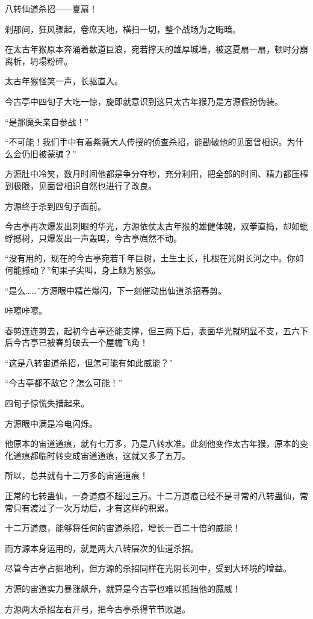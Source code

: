 \begin{this_body}
八转仙道杀招――夏扇！

刹那间，狂风骤起，卷席天地，横扫一切，整个战场为之晦暗。

在太古年猴原本奔涌着数道巨浪，宛若撑天的雄厚城墙，被这夏扇一扇，顿时分崩离析，坍塌粉碎。

太古年猴怪笑一声，长驱直入。

今古亭中四旬子大吃一惊，旋即就意识到这只太古年猴乃是方源假扮伪装。

“是那魔头亲自参战！”

“不可能！我们手中有着紫薇大人传授的侦查杀招，能勘破他的见面曾相识。为什么会仍旧被蒙骗？”

方源肚中冷笑，数月时间他都是争分夺秒，充分利用，把全部的时间、精力都压榨到极限，见面曾相识自然也进行了改良。

方源终于杀到四旬子面前。

今古亭再次爆发出刺眼的华光，方源依仗太古年猴的雄健体魄，双拳直捣，却如蚍蜉撼树，只爆发出一声轰鸣，今古亭岿然不动。

“没有用的，现在的今古亭宛若千年巨树，土生土长，扎根在光阴长河之中。你如何能撼动？”旬果子尖叫，身上颇为紧张。

“是么……”方源眼中精芒爆闪，下一刻催动出仙道杀招春剪。

咔嚓咔嚓。

春剪连连剪去，起初今古亭还能支撑，但三两下后，表面华光就明显不支，五六下后今古亭已被春剪破去一个屋檐飞角！

“这是八转宙道杀招，但怎可能有如此威能？”

“今古亭都不敌它？怎么可能！”

四旬子惊慌失措起来。

方源眼中满是冷电闪烁。

他原本的宙道道痕，就有七万多，乃是八转水准。此刻他变作太古年猴，原本的变化道痕都临时转变成宙道道痕，这就又多了五万。

所以，总共就有十二万多的宙道道痕！

正常的七转蛊仙，一身道痕不超过三万。十二万道痕已经不是寻常的八转蛊仙，常常只有渡过了一次万劫后，才有这样的积累。

十二万道痕，能够将任何的宙道杀招，增长一百二十倍的威能！

而方源本身运用的，就是两大八转层次的仙道杀招。

尽管今古亭占据地利，但方源的杀招同样在光阴长河中，受到大环境的增益。

方源的宙道实力暴涨飙升，就算是今古亭也难以抵挡他的魔威！

方源两大杀招左右开弓，把今古亭杀得节节败退。


\end{this_body}
